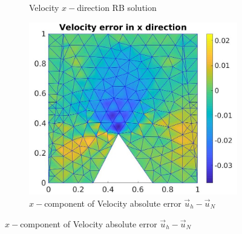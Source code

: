 \documentclass[graybox]{svmult}
\begin{document}
\begin{figure}[H]
\begin{subfigure}{0.31\textwidth}
\caption{Velocity $x-$direction RB solution} \label{vel_x_rb}
\end{subfigure}
\begin{subfigure}{0.31\textwidth}
\includegraphics[width=\linewidth]{velocity_error_1_at_47_33.jpg}
\caption{$x-$component of Velocity absolute error $\overrightarrow{u}_h-\overrightarrow{u}_N$} \label{error_x_vel}
\end{subfigure}


\end{figure}
\end{document}
